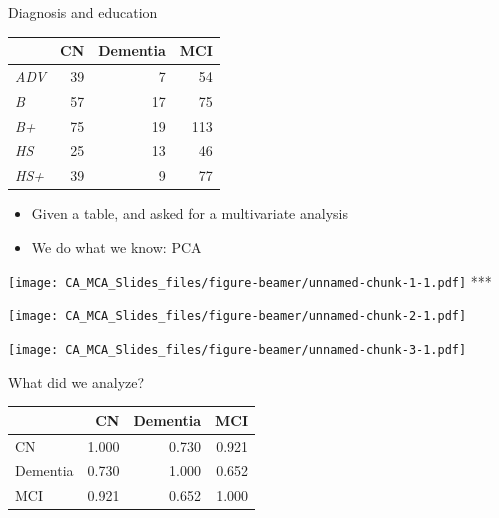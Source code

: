 \documentclass[
  ignorenonframetext,
]{beamer}
\providecommand{\tightlist}{%
  \setlength{\itemsep}{0pt}\setlength{\parskip}{0pt}}
\begin{document}
\begin{frame}{Diagnosis and education}
\protect\hypertarget{diagnosis-and-education}{}

\begin{table}[H]
\centering
\begin{tabular}{>{\em}lrrr}
\toprule
  & CN & Dementia & MCI\\
\midrule
ADV & 39 & 7 & 54\\
B & 57 & 17 & 75\\
B+ & 75 & 19 & 113\\
HS & 25 & 13 & 46\\
HS+ & 39 & 9 & 77\\
\bottomrule
\end{tabular}
\end{table}

\end{frame}

\begin{frame}

\begin{itemize}[<+->]
\tightlist
\item
  Given a table, and asked for a multivariate analysis
\item
  We do what we know: PCA
\end{itemize}

\end{frame}

\begin{frame}

\end{frame}

\begin{frame}

\texttt{[image: CA\_MCA\_Slides\_files/figure-beamer/unnamed-chunk-1-1.pdf]}
***

\texttt{[image: CA\_MCA\_Slides\_files/figure-beamer/unnamed-chunk-2-1.pdf]}

\end{frame}

\begin{frame}

\texttt{[image: CA\_MCA\_Slides\_files/figure-beamer/unnamed-chunk-3-1.pdf]}

\end{frame}

\begin{frame}{What did we analyze?}
\protect\hypertarget{what-did-we-analyze}{}

\begin{table}[H]
\centering
\begin{tabular}{lrrr}
\toprule
  & CN & Dementia & MCI\\
\midrule
CN & 1.000 & 0.730 & 0.921\\
Dementia & 0.730 & 1.000 & 0.652\\
MCI & 0.921 & 0.652 & 1.000\\
\bottomrule
\end{tabular}
\end{table}

\end{frame}
\end{document}
